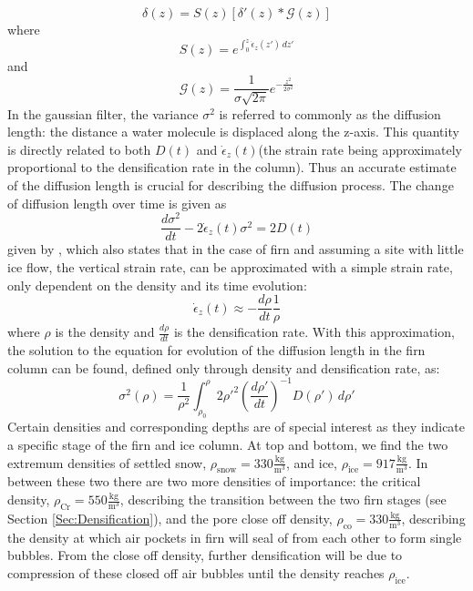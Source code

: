 \documentclass[../../CompleteThesis2/Complete_2ndDraft]{subfiles}
\begin{document}
\begin{equation}
	\delta(z) = S(z)[\delta'(z)*\mathcal{G}(z)]
	\label{Eq:diff_solution_conv}
\end{equation}
where
\begin{equation}
	S(z) = e^{\int_{0}^{z}\dot{\epsilon}_z(z')\, dz'}
	\label{Eq:Thinning_fct}
\end{equation}
and
\begin{equation}
	\mathcal{G}(z) = \frac{1}{\sigma\sqrt{2\pi}}e^{-\frac{z^2}{2\sigma^2}}
	\label{Eq:Gauss_filter}
\end{equation}
In the gaussian filter, the variance $\sigma^2$ is referred to commonly as the diffusion length: the distance a water molecule is displaced along the z-axis. This quantity is directly related to both $D(t)$ and $\dot{\epsilon}_z(t)$(the strain rate being approximately proportional to the densification rate in the column). Thus an accurate estimate of the diffusion length is crucial for describing the diffusion process.
The change of diffusion length over time is given as 
\begin{equation}
	\frac{d\sigma^2}{dt} - 2\dot{\epsilon}_z (t)\sigma^2 = 2 D(t)
	\label{Eq:Evolution_DiffLen}
\end{equation}
given by \cite[Johnsen, 1977]{Johnsen1977}, which also states that in the case of firn and assuming a site with little ice flow, the vertical strain rate, can be approximated with a simple strain rate, only dependent on the density and its time evolution:
\begin{equation}
	\dot{\epsilon}_z(t) \approx - \frac{d\rho}{dt}\frac{1}{\rho}
	\label{Eq:strain_rate_approx}
\end{equation}
where $\rho$ is the density and $\frac{d\rho}{dt}$ is the densification rate. With this approximation, the solution to the equation for evolution of the diffusion length in the firn column can be found, defined only through density and densification rate, as:
\begin{equation}
	\sigma^2(\rho) =\frac{1}{\rho^2} \int_{\rho_0}^{\rho}2\rho'^2\left(\frac{d\rho'}{dt}\right)^{-1} D(\rho') \, d\rho'
	\label{Eq:Diff_Len_Firn}
\end{equation}
Certain densities and corresponding depths are of special interest as they indicate a specific stage of the firn and ice column. At top and bottom, we find the two extremum densities of settled snow, $\rho_{\text{snow}} = 330 \frac{\text{kg}}{\text{m}^3}$, and ice, $\rho_{\text{ice}} = 917 \frac{\text{kg}}{\text{m}^3}$. In between these two there are two more densities of importance: the critical density, $\rho_{\text{Cr}} = 550 \frac{\text{kg}}{\text{m}^3}$, describing the transition between the two firn stages (see Section \ref{Sec:Densification}), and the pore close off density, $\rho_{\text{co}} = 330 \frac{\text{kg}}{\text{m}^3}$, describing the density at which air pockets in firn will seal of from each other to form single bubbles. From the close off density, further densification will be due to compression of these closed off air bubbles until the density reaches $\rho_{\text{ice}}$.
\end{document}
